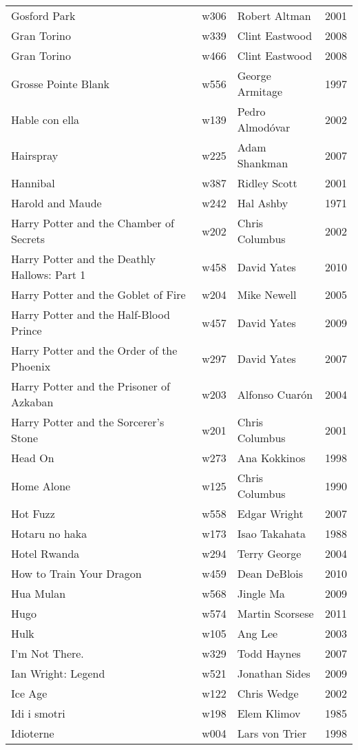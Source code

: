 \documentclass{article}
\begin{document}
\begin {center}
\begin{longtable}{p{10cm} l l l}
Gosford Park & w306 & Robert Altman & 2001 \\
Gran Torino & w339 & Clint Eastwood & 2008 \\
Gran Torino & w466 & Clint Eastwood & 2008 \\
Grosse Pointe Blank & w556 & George Armitage & 1997 \\
Hable con ella & w139 & Pedro Almodóvar & 2002 \\
Hairspray & w225 & Adam Shankman & 2007 \\
Hannibal & w387 & Ridley Scott & 2001 \\
Harold and Maude & w242 & Hal Ashby & 1971 \\
Harry Potter and the Chamber of Secrets & w202 & Chris Columbus & 2002 \\
Harry Potter and the Deathly Hallows: Part 1 & w458 & David Yates & 2010 \\
Harry Potter and the Goblet of Fire & w204 & Mike Newell & 2005 \\
Harry Potter and the Half-Blood Prince & w457 & David Yates & 2009 \\
Harry Potter and the Order of the Phoenix & w297 & David Yates & 2007 \\
Harry Potter and the Prisoner of Azkaban & w203 & Alfonso Cuarón & 2004 \\
Harry Potter and the Sorcerer's Stone & w201 & Chris Columbus & 2001 \\
Head On & w273 & Ana Kokkinos & 1998 \\
Home Alone & w125 & Chris Columbus & 1990 \\
Hot Fuzz & w558 & Edgar Wright & 2007 \\
Hotaru no haka & w173 & Isao Takahata & 1988 \\
Hotel Rwanda & w294 & Terry George & 2004 \\
How to Train Your Dragon & w459 & Dean DeBlois & 2010 \\
Hua Mulan & w568 & Jingle Ma & 2009 \\
Hugo & w574 & Martin Scorsese & 2011 \\
Hulk & w105 & Ang Lee & 2003 \\
I'm Not There. & w329 & Todd Haynes & 2007 \\
Ian Wright: Legend & w521 & Jonathan Sides & 2009 \\
Ice Age & w122 & Chris Wedge & 2002 \\
Idi i smotri & w198 & Elem Klimov & 1985 \\
Idioterne & w004 & Lars von Trier & 1998 \\

\end{longtable}
\end{center}
\end{document}
